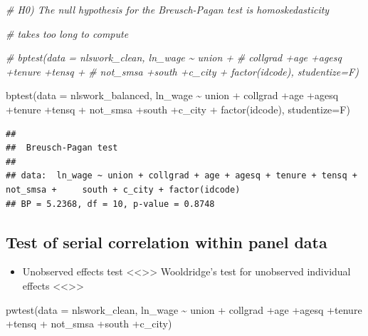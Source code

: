 \documentclass[
]{article}
\newenvironment{Shaded}{\begin{snugshade}}{\end{snugshade}}
\newcommand{\AttributeTok}[1]{\textcolor[rgb]{0.77,0.63,0.00}{#1}}
\newcommand{\CommentTok}[1]{\textcolor[rgb]{0.56,0.35,0.01}{\textit{#1}}}
\newcommand{\FunctionTok}[1]{\textcolor[rgb]{0.00,0.00,0.00}{#1}}
\newcommand{\NormalTok}[1]{#1}
\newcommand{\SpecialCharTok}[1]{\textcolor[rgb]{0.00,0.00,0.00}{#1}}
\providecommand{\tightlist}{%
  \setlength{\itemsep}{0pt}\setlength{\parskip}{0pt}}
\begin{document}
\begin{Shaded}
\begin{Highlighting}[]
\CommentTok{\# H0) The null hypothesis for the Breusch{-}Pagan test is homoskedasticity}

\CommentTok{\# takes too long to compute}

\CommentTok{\# bptest(data = nlswork\_clean, ln\_wage \textasciitilde{} union +}
\CommentTok{\#          collgrad +age +agesq +tenure +tensq +}
\CommentTok{\#          not\_smsa +south +c\_city + factor(idcode), studentize=F)}


  \FunctionTok{bptest}\NormalTok{(}\AttributeTok{data =}\NormalTok{ nlswork\_balanced, ln\_wage }\SpecialCharTok{\textasciitilde{}}\NormalTok{ union }\SpecialCharTok{+}
\NormalTok{           collgrad }\SpecialCharTok{+}\NormalTok{age }\SpecialCharTok{+}\NormalTok{agesq }\SpecialCharTok{+}\NormalTok{tenure }\SpecialCharTok{+}\NormalTok{tensq }\SpecialCharTok{+}
\NormalTok{           not\_smsa }\SpecialCharTok{+}\NormalTok{south }\SpecialCharTok{+}\NormalTok{c\_city }\SpecialCharTok{+} \FunctionTok{factor}\NormalTok{(idcode), }\AttributeTok{studentize=}\NormalTok{F)}
\end{Highlighting}
\end{Shaded}

\begin{verbatim}
## 
##  Breusch-Pagan test
## 
## data:  ln_wage ~ union + collgrad + age + agesq + tenure + tensq + not_smsa +     south + c_city + factor(idcode)
## BP = 5.2368, df = 10, p-value = 0.8748
\end{verbatim}

\hypertarget{test-of-serial-correlation-within-panel-data}{%
\subsection{Test of serial correlation within panel
data}\label{test-of-serial-correlation-within-panel-data}}

\begin{itemize}
\tightlist
\item
  Unobserved effects test \textless\textless\textgreater\textgreater{}
  Wooldridge's test for unobserved individual effects
  \textless\textless\textgreater\textgreater{}
\end{itemize}

\begin{Shaded}
\begin{Highlighting}[]
  \FunctionTok{pwtest}\NormalTok{(}\AttributeTok{data =}\NormalTok{ nlswork\_clean, ln\_wage }\SpecialCharTok{\textasciitilde{}}\NormalTok{ union }\SpecialCharTok{+}
\NormalTok{           collgrad }\SpecialCharTok{+}\NormalTok{age }\SpecialCharTok{+}\NormalTok{agesq }\SpecialCharTok{+}\NormalTok{tenure }\SpecialCharTok{+}\NormalTok{tensq }\SpecialCharTok{+}
\NormalTok{           not\_smsa }\SpecialCharTok{+}\NormalTok{south }\SpecialCharTok{+}\NormalTok{c\_city)}
\end{Highlighting}
\end{Shaded}
\end{document}
